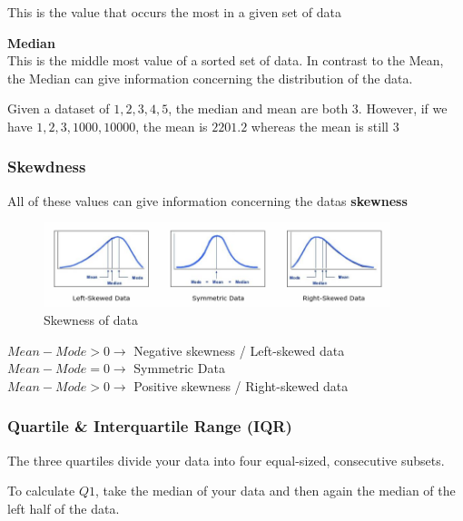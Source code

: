 \documentclass[11pt]{article}
\begin{document}
This is the value that occurs the most in a given set of data

\vspace{10px}

\noindent \textbf{Median} \\

This is the middle most value of a sorted set of data. In contrast to the Mean, the Median can give information concerning the distribution of the data.

Given a dataset of $1, 2, 3, 4, 5$, the median and mean are both $3$. However, if we have $1, 2, 3, 1000, 10000$, the mean is $2201.2$ whereas the mean is still $3$

\newpage

\subsubsection{Skewdness}

All of these values can give information concerning the datas \textbf{skewness}

\begin{figure}[htb!]
    \centering
    \includegraphics[keepaspectratio=true, width=0.9\textwidth]{skewness.png}
    \caption{Skewness of data}
    \label{fig:skewness}
\end{figure}

\noindent
$Mean - Mode > 0 \rightarrow$ Negative skewness / Left-skewed data \\
$Mean - Mode = 0 \rightarrow$ Symmetric Data \\
$Mean - Mode > 0 \rightarrow$ Positive skewness / Right-skewed data

\vspace{10px}

\subsubsection{Quartile \& Interquartile Range (IQR)}

The three quartiles divide your data into four equal-sized, consecutive subsets.

To calculate $Q1$, take the median of your data and then again the median of the left half of the data.
\end{document}
